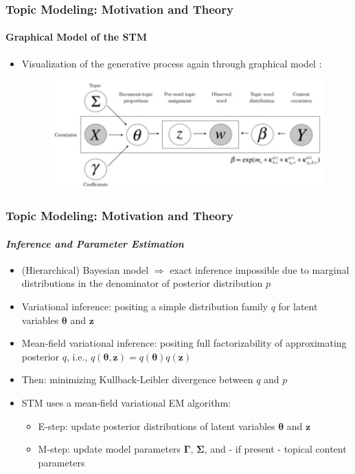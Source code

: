 \documentclass[xcolor=dvipsnames]{beamer}
\begin{document}
\begin{frame}
\frametitle{Topic Modeling: Motivation and Theory}
\framesubtitle{Graphical Model of the STM}
\begin{itemize}
\item Visualization of the generative process again through graphical model \cite{roberts2016model}:
\begin{figure}[h!]
\centering
\hspace*{-1cm}\includegraphics[scale = 0.4]{../plots/presentation/stm_graphical.png}
\end{figure}
\end{itemize}
\end{frame}

\begin{frame}
\frametitle{Topic Modeling: Motivation and Theory}
\framesubtitle{\textit{Inference and Parameter Estimation}}
\begin{itemize}
\vspace{-0.5cm}
\item (Hierarchical) Bayesian model $\Rightarrow$ exact inference impossible due to marginal distributions in the denominator of posterior distribution $p$
\item Variational inference: positing a simple distribution family $q$ for latent variables $\boldsymbol{\theta}$ and $\boldsymbol{z}$
\item Mean-field variational inference: positing full factorizability of approximating posterior $q$, i.e., $q(\boldsymbol{\theta}, \boldsymbol{z})=q(\boldsymbol{\theta})q(\boldsymbol{z})$
\item Then: minimizing Kullback-Leibler divergence between $q$ and $p$
\item STM uses a mean-field variational EM algorithm:
\begin{itemize}
\item E-step: update posterior distributions of latent variables $\boldsymbol{\theta}$ and $\boldsymbol{z}$
\item M-step: update model parameters $\boldsymbol{\Gamma}$, $\boldsymbol{\Sigma}$, and - if present - topical content parameters
\end{itemize}
\end{itemize}
\end{frame}
\end{document}
